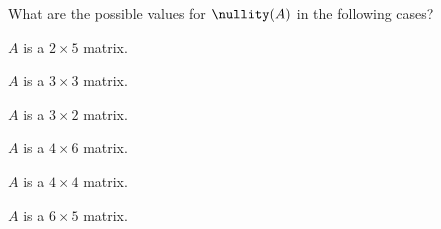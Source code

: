 \begin{exercise} \label{ex:} 
What are the possible values for \(\nullity(A)\) in the following cases?
\begin{parts}
\item \(A\) is a \(2\times 5\) matrix.

\item \(A\) is a \(3\times 3\) matrix.

\item \(A\) is a \(3\times 2\) matrix.

\item \(A\) is a \(4\times 6\) matrix.

\item \(A\) is a \(4\times 4\) matrix.

\item \(A\) is a \(6\times 5\) matrix.

\end{parts}
\end{exercise}






